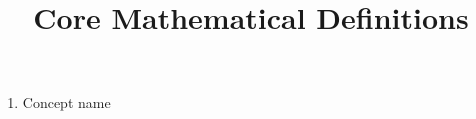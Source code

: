 \documentclass[11pt,a4paper]{article}
\title{Core Mathematical Definitions}
\author{}
\date{}
\begin{document}
\maketitle

\begin{enumerate}[series=definitions]
\item Concept name
\end{enumerate}
\end{document}
